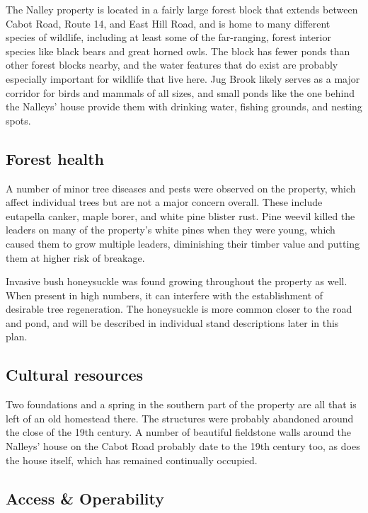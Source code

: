 \documentclass[]{tufte-handout}
\begin{document}
The Nalley property is located in a fairly large forest block that
extends between Cabot Road, Route 14, and East Hill Road, and is home to
many different species of wildlife, including at least some of the
far-ranging, forest interior species like black bears and great horned
owls. The block has fewer ponds than other forest blocks nearby, and the
water features that do exist are probably especially important for
wildlife that live here. Jug Brook likely serves as a major corridor for
birds and mammals of all sizes, and small ponds like the one behind the
Nalleys' house provide them with drinking water, fishing grounds, and
nesting spots.

\subsection{Forest health}\label{forest-health}

A number of minor tree diseases and pests were observed on the property,
which affect individual trees but are not a major concern overall. These
include eutapella canker, maple borer, and white pine blister rust. Pine
weevil killed the leaders on many of the property's white pines when
they were young, which caused them to grow multiple leaders, diminishing
their timber value and putting them at higher risk of breakage.

Invasive bush honeysuckle was found growing throughout the property as
well. When present in high numbers, it can interfere with the
establishment of desirable tree regeneration. The honeysuckle is more
common closer to the road and pond, and will be described in individual
stand descriptions later in this plan.

\subsection{Cultural resources}\label{cultural-resources}

Two foundations and a spring in the southern part of the property are
all that is left of an old homestead there. The structures were probably
abandoned around the close of the 19th century. A number of beautiful
fieldstone walls around the Nalleys' house on the Cabot Road probably
date to the 19th century too, as does the house itself, which has
remained continually occupied.

\subsection{Access \& Operability}\label{access-operability}
\end{document}
